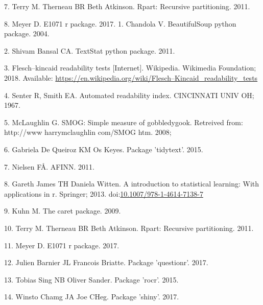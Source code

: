 \documentclass[10pt,letterpaper]{article}
\begin{document}
\hypertarget{ref-rpart}{}
7. Terry M. Therneau BR Beth Atkinson. Rpart: Recursive partitioning.
2011.

\hypertarget{ref-e1071}{}
8. Meyer D. E1071 r package. 2017.
\leavevmode\hypertarget{ref-BeautifulSoup}{}%
1. Chandola V. BeautifulSoup python package. 2004.

\leavevmode\hypertarget{ref-textstat}{}%
2. Shivam Bansal CA. TextStat python package. 2011.

\leavevmode\hypertarget{ref-wikipedia_2018}{}%
3. Flesch--kincaid readability tests {[}Internet{]}. Wikipedia.
Wikimedia Foundation; 2018. Available:
\url{https://en.wikipedia.org/wiki/Flesch–Kincaid_readability_tests}

\leavevmode\hypertarget{ref-senter1967automated}{}%
4. Senter R, Smith EA. Automated readability index. CINCINNATI UNIV OH;
1967.

\leavevmode\hypertarget{ref-mclaughlin2008smog}{}%
5. McLaughlin G. SMOG: Simple measure of gobbledygook. Retreived from:
http://www harrymclaughlin com/SMOG htm. 2008;

\leavevmode\hypertarget{ref-tidytext}{}%
6. Gabriela De Queiroz KM Os Keyes. Package 'tidytext'. 2015.

\leavevmode\hypertarget{ref-AFINN}{}%
7. Nielsen FÅ. AFINN. 2011.

\leavevmode\hypertarget{ref-MLbook}{}%
8. Gareth James TH Daniela Witten. A introduction to statistical
learning: With applications in r. Springer; 2013.
doi:\href{https://doi.org/10.1007/978-1-4614-7138-7}{10.1007/978-1-4614-7138-7}

\leavevmode\hypertarget{ref-Kuhn09thecaret}{}%
9. Kuhn M. The caret package. 2009.

\leavevmode\hypertarget{ref-rpart}{}%
10. Terry M. Therneau BR Beth Atkinson. Rpart: Recursive partitioning.
2011.

\leavevmode\hypertarget{ref-e1071}{}%
11. Meyer D. E1071 r package. 2017.

\leavevmode\hypertarget{ref-questionr}{}%
12. Julien Barnier JL Francois Briatte. Package 'questionr'. 2017.

\leavevmode\hypertarget{ref-ROCR}{}%
13. Tobias Sing NB Oliver Sander. Package 'rocr'. 2015.

\leavevmode\hypertarget{ref-shiny}{}%
14. Winsto Chamg JA Joe CHeg. Package 'shiny'. 2017.


\nolinenumbers
\end{document}
